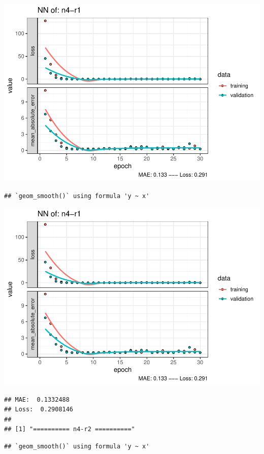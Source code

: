 \documentclass[
]{article}
\begin{document}
\includegraphics{project-code_files/figure-latex/unnamed-chunk-18-29.pdf}

\begin{verbatim}
## `geom_smooth()` using formula 'y ~ x'
\end{verbatim}

\includegraphics{project-code_files/figure-latex/unnamed-chunk-18-30.pdf}

\begin{verbatim}
## MAE:  0.1332488
## Loss:  0.2908146 
## 
## [1] "========== n4-r2 =========="
\end{verbatim}

\begin{verbatim}
## `geom_smooth()` using formula 'y ~ x'
\end{verbatim}
\end{document}
